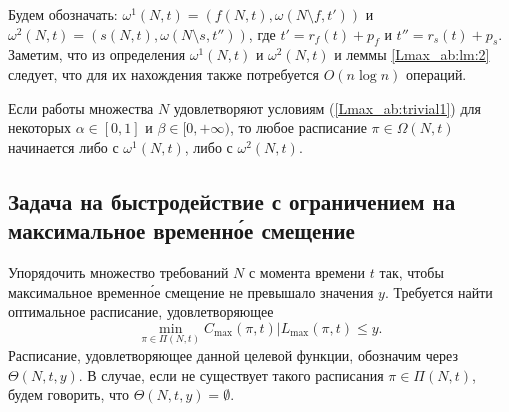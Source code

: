 Будем обозначать: $\omega^1(N,t) = (f(N,t),\omega(N \setminus f,t'))$ и $\omega^2(N,t) = (s(N,t),\omega(N \setminus s,t''))$, где $t' = r_f(t) + p_f$ и $t'' = r_s(t) + p_s$.
Заметим, что из определения $\omega^1(N, t)$ и $\omega^2(N, t)$ и леммы \ref{Lmax_ab:lm:2} следует, что для их нахождения также потребуется $O(n \log n)$ операций.

\begin{corollary} \label{Lmax_ab:cr:1}
Если работы множества $N$ удовлетворяют условиям (\ref{Lmax_ab:trivial1}) для некоторых $\alpha \in [0,1]$ и $\beta \in [0, +\infty)$, то любое расписание $\pi \in \Omega(N, t)$ начинается либо с $\omega^1(N,t)$, либо с $\omega^2(N,t)$.
\end{corollary}
\subsection{Задача на быстродействие с ограничением на максимальное временн\'{о}е смещение}
\begin{problem}\label{Lmax_ab:pr:2}
Упорядочить множество требований $N$ с момента времени $t$ так, чтобы максимальное временн\'{о}е смещение не превышало значения $y$.
Требуется найти оптимальное расписание, удовлетворяющее
\begin{equation*}
\min\limits_{\pi \in \Pi(N, t)} C_{\max}(\pi,t) | L_{\max}(\pi,t) \leq y.
\end{equation*}
Расписание, удовлетворяющее данной целевой функции, обозначим через $\Theta(N, t, y)$. В случае, если не существует такого расписания $\pi \in \Pi(N, t)$, будем говорить, что $\Theta(N, t, y) = \emptyset$.
\end{problem}

